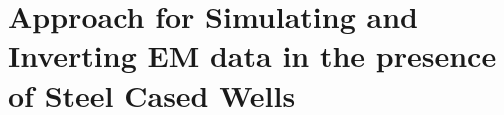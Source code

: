 
\chapter{Approach for Simulating and Inverting EM data in the presence of Steel Cased Wells}
\label{ch:casing_and_3D}
